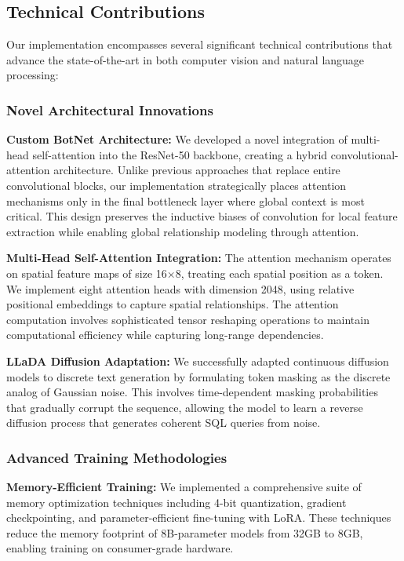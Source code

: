 \documentclass[a4paper,12pt]{article}
\begin{document}
\subsection{Technical Contributions}

Our implementation encompasses several significant technical contributions that advance the state-of-the-art in both computer vision and natural language processing:

\subsubsection{Novel Architectural Innovations}

\textbf{Custom BotNet Architecture:} We developed a novel integration of multi-head self-attention into the ResNet-50 backbone, creating a hybrid convolutional-attention architecture. Unlike previous approaches that replace entire convolutional blocks, our implementation strategically places attention mechanisms only in the final bottleneck layer where global context is most critical. This design preserves the inductive biases of convolution for local feature extraction while enabling global relationship modeling through attention.

\textbf{Multi-Head Self-Attention Integration:} The attention mechanism operates on spatial feature maps of size 16×8, treating each spatial position as a token. We implement eight attention heads with dimension 2048, using relative positional embeddings to capture spatial relationships. The attention computation involves sophisticated tensor reshaping operations to maintain computational efficiency while capturing long-range dependencies.

\textbf{LLaDA Diffusion Adaptation:} We successfully adapted continuous diffusion models to discrete text generation by formulating token masking as the discrete analog of Gaussian noise. This involves time-dependent masking probabilities that gradually corrupt the sequence, allowing the model to learn a reverse diffusion process that generates coherent SQL queries from noise.

\subsubsection{Advanced Training Methodologies}

\textbf{Memory-Efficient Training:} We implemented a comprehensive suite of memory optimization techniques including 4-bit quantization, gradient checkpointing, and parameter-efficient fine-tuning with LoRA. These techniques reduce the memory footprint of 8B-parameter models from 32GB to 8GB, enabling training on consumer-grade hardware.
\end{document}
